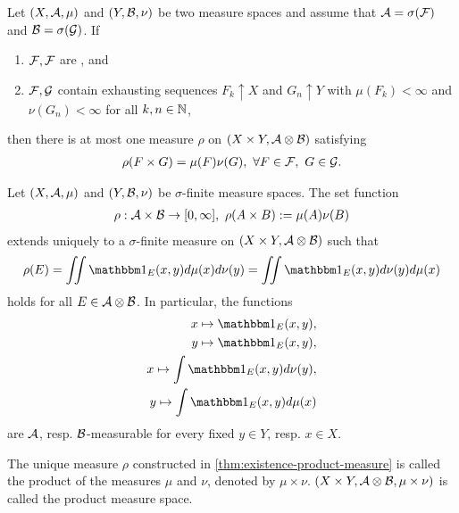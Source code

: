\begin{thm}
	Let $(X, \mathcal{A}, \mu)$ and $(Y, \mathcal{B}, \nu)$ be two measure spaces and assume that $\mathcal{A} = \sigma(\mathcal{F})$ and $\mathcal{B} = \sigma(\mathcal{G})$. If
	\begin{enumerate}
		\item $\mathcal{F}, \mathcal{F}$ are \istable, and
		\item $\mathcal{F}, \mathcal{G}$ contain exhausting sequences $F_k \uparrow X$ and $G_n \uparrow Y$ with $\mu(F_k) < \infty$ and $\nu(G_n) < \infty$ for all $k, n \in \mathbb{N}$,
	\end{enumerate}
	then there is at most one measure $\rho$ on $(X \times Y, \mathcal{A} \otimes \mathcal{B})$ satisfying
	\begin{align*}
		\rho(F \times G) = \mu(F) \nu(G),\ \forall F \in \mathcal{F},\ G \in \mathcal{G}.
	\end{align*}
\end{thm}

\begin{thm}
	\label{thm:existence-product-measure}
	Let $(X, \mathcal{A}, \mu)$ and $(Y, \mathcal{B}, \nu)$ be $\sigma$-finite measure spaces. The set function
	\begin{align*}
		\rho : \mathcal{A} \times \mathcal{B} \to [0,\infty],\ \rho(A \times B) := \mu(A)\nu(B)
	\end{align*}
	extends uniquely to a $\sigma$-finite measure on $(X \times Y, \mathcal{A} \otimes \mathcal{B})$ such that
	\begin{align}
		\rho(E) = \iint \ind_E(x, y) d\mu(x) d\nu(y)
		= \iint \ind_E(x, y) d\nu(y)d\mu(x)
	\end{align}
	holds for all $E \in \mathcal{A} \otimes \mathcal{B}$. In particular, the functions
	\begin{align}
		x \mapsto \ind_E(x, y),\\
		y \mapsto \ind_E(x, y),\\
		x \mapsto \int \ind_E(x, y) d\nu(y),\\
		y \mapsto \int \ind_E(x, y) d\mu(x)
	\end{align}
	are $\mathcal{A}$, resp. $\mathcal{B}$-measurable for every fixed $y \in Y$, resp. $x \in X$.
\end{thm}

\begin{dfn}
	The unique measure $\rho$ constructed in \autoref{thm:existence-product-measure} is called the product of the measures $\mu$ and $\nu$, denoted by $\mu \times \nu$. $(X \times Y, \mathcal{A} \otimes \mathcal{B}, \mu \times \nu)$ is called the product measure space.
\end{dfn}

